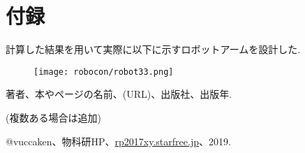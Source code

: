 \documentclass[10pt,b5paper,papersize,dvipdfmx]{jsbook}
\begin{document}
\section{付録}
計算した結果を用いて実際に以下に示すロボットアームを設計した. 
\begin{figure}[H]
  \centering
  \texttt{[image: robocon/robot33.png]}
\end{figure}

\begin{thebibliography}{99}
  \item 著者、本やページの名前、(URL)、出版社、出版年.
  \item (複数ある場合は追加)
  \item @vuccaken、物科研HP、\url{rp2017xy.starfree.jp}、2019.
\end{thebibliography}
\end{document}
